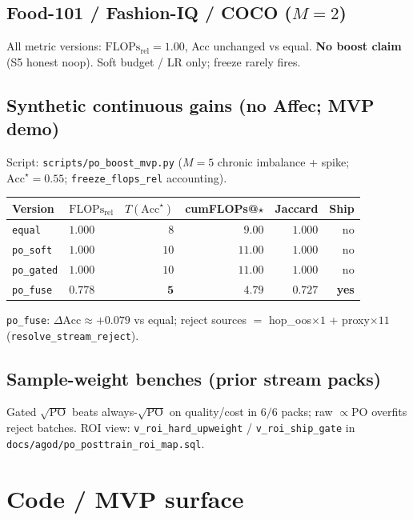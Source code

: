 \documentclass[11pt]{article}
\newcommand{\PO}{\mathrm{PO}}
\newcommand{\Flops}{\mathrm{FLOPs}_{\mathrm{rel}}}
\newcommand{\Acc}{\mathrm{Acc}}
\begin{document}
\subsection{Food-101 / Fashion-IQ / COCO ($M{=}2$)}
All metric versions: $\Flops{=}1.00$, Acc unchanged vs equal.
\textbf{No boost claim} (S5 honest noop). Soft budget / LR only;
freeze rarely fires.

\subsection{Synthetic continuous gains (no Affec; MVP demo)}
Script: \texttt{scripts/po\_boost\_mvp.py}
($M{=}5$ chronic imbalance + spike; $\Acc^\star{=}0.55$;
\texttt{freeze\_flops\_rel} accounting).

\begin{center}
\small
\begin{tabular}{@{}llrrrr@{}}
\toprule
Version & $\Flops$ & $T(\Acc^\star)$ & cumFLOPs@$\star$
  & Jaccard & Ship \\
\midrule
\texttt{equal}    & $1.000$ & $8$ & $9.00$ & $1.000$ & no \\
\texttt{po\_soft} & $1.000$ & $10$ & $11.00$ & $1.000$ & no \\
\texttt{po\_gated}& $1.000$ & $10$ & $11.00$ & $1.000$ & no \\
\texttt{po\_fuse} & $\mathbf{0.778}$ & $\mathbf{5}$ & $4.79$
  & $0.727$ & \textbf{yes} \\
\bottomrule
\end{tabular}
\end{center}

\texttt{po\_fuse}: $\Delta\Acc\approx+0.079$ vs equal;
reject sources $=$ hop\_oos$\times1$ + proxy$\times11$
(\texttt{resolve\_stream\_reject}).

\subsection{Sample-weight benches (prior stream packs)}
Gated $\sqrt{\PO}$ beats always-$\sqrt{\PO}$ on quality/cost in
$6/6$ packs; raw $\propto\PO$ overfits reject batches.
ROI view: \texttt{v\_roi\_hard\_upweight} /
\texttt{v\_roi\_ship\_gate} in
\texttt{docs/agod/po\_posttrain\_roi\_map.sql}.

\section{Code / MVP surface}
\label{sec:code}
\end{document}
